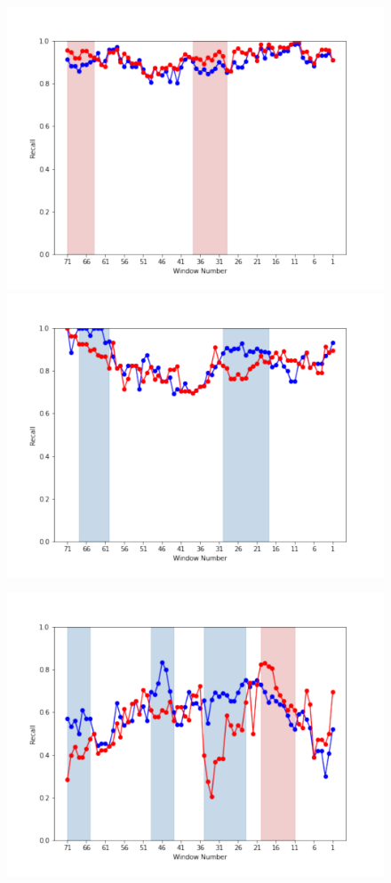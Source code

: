 \documentclass[submit]{ipsj}
\begin{document}
\begin{figure}[t]
\begin{minipage}[b]{0.65\columnwidth}
    \includegraphics[width=1\columnwidth]{Uenaka_fig/RQ2_result/Cinder/Cinder_review_Recall.pdf}
    \includegraphics[width=1\columnwidth]{Uenaka_fig/RQ2_result/Keystone/Keystone_review_Recall.pdf}
\end{minipage}
\begin{minipage}[b]{0.65\columnwidth}
    \centering
    \includegraphics[width=1\columnwidth]{Uenaka_fig/RQ2_result/Swift/Swift_review_Recall.pdf}

\end{minipage}
\end{figure}
\end{document}

